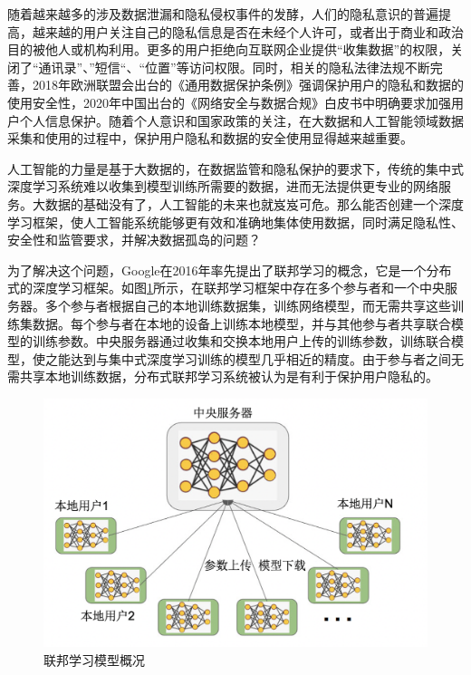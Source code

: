 随着越来越多的涉及数据泄漏和隐私侵权事件的发酵，人们的隐私意识的普遍提高，越来越的用户关注自己的隐私信息是否在未经个人许可，或者出于商业和政治目的被他人或机构利用。更多的用户拒绝向互联网企业提供“收集数据”的权限，关闭了“通讯录”、”短信“、“位置”等访问权限。同时，相关的隐私法律法规不断完善，2018年欧洲联盟会出台的《通用数据保护条例》强调保护用户的隐私和数据的使用安全性，2020年中国出台的《网络安全与数据合规》白皮书中明确要求加强用户个人信息保护。随着个人意识和国家政策的关注，在大数据和人工智能领域数据采集和使用的过程中，保护用户隐私和数据的安全使用显得越来越重要。

人工智能的力量是基于大数据的，在数据监管和隐私保护的要求下，传统的集中式深度学习系统难以收集到模型训练所需要的数据，进而无法提供更专业的网络服务。大数据的基础没有了，人工智能的未来也就岌岌可危。那么能否创建一个深度学习框架，使人工智能系统能够更有效和准确地集体使用数据，同时满足隐私性、安全性和监管要求，并解决数据孤岛的问题？

为了解决这个问题，Google在2016年率先提出了联邦学习的概念，它是一个分布式的深度学习框架。如图\ref{fig:联邦学习模型概况}所示，在联邦学习框架中存在多个参与者和一个中央服务器。多个参与者根据自己的本地训练数据集，训练网络模型，而无需共享这些训练集数据。每个参与者在本地的设备上训练本地模型，并与其他参与者共享联合模型的训练参数。中央服务器通过收集和交换本地用户上传的训练参数，训练联合模型，使之能达到与集中式深度学习训练的模型几乎相近的精度。由于参与者之间无需共享本地训练数据，分布式联邦学习系统被认为是有利于保护用户隐私的。

\begin{figure}[!hbt]
\centering
	\includegraphics[scale=0.5]{fig2/C1/联邦学习}%
	\caption{联邦学习模型概况}
	\label{fig:联邦学习模型概况}	
\end{figure}

